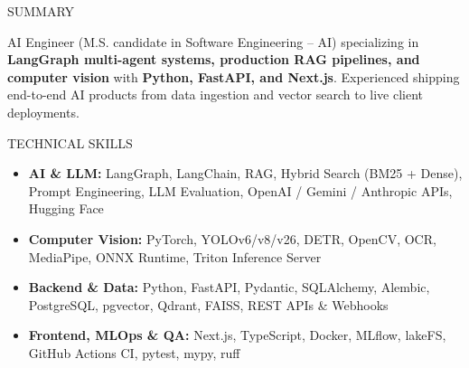\documentclass[10pt]{resume}
\begin{document}
\begin{rSection}{SUMMARY}

AI Engineer (M.S. candidate in Software Engineering -- AI) specializing in \textbf{LangGraph multi-agent systems, production RAG pipelines, and computer vision} with \textbf{Python, FastAPI, and Next.js}. Experienced shipping end-to-end AI products from data ingestion and vector search to live client deployments.

\end{rSection}

\begin{rSection}{TECHNICAL SKILLS}

\begin{itemize}
    \item \textbf{AI \& LLM:} LangGraph, LangChain, RAG, Hybrid Search (BM25 + Dense), Prompt Engineering, LLM Evaluation, OpenAI / Gemini / Anthropic APIs, Hugging Face
    \item \textbf{Computer Vision:} PyTorch, YOLOv6/v8/v26, DETR, OpenCV, OCR, MediaPipe, ONNX Runtime, Triton Inference Server
    \item \textbf{Backend \& Data:} Python, FastAPI, Pydantic, SQLAlchemy, Alembic, PostgreSQL, pgvector, Qdrant, FAISS, REST APIs \& Webhooks
    \item \textbf{Frontend, MLOps \& QA:} Next.js, TypeScript, Docker, MLflow, lakeFS, GitHub Actions CI, pytest, mypy, ruff
\end{itemize}

\end{rSection}
\end{document}
